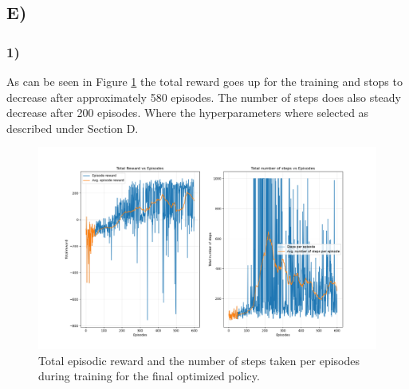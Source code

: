 \documentclass{article}
\begin{document}
\subsection*{E)}
\subsubsection*{1)}
As can be seen in Figure \ref{fig:Policy} the total reward goes up for the training and stops to decrease after approximately 580 episodes. The number of steps does also steady decrease after 200 episodes. Where the hyperparameters where selected as described under Section D.
\begin{figure}[H]
    \centering
    \includegraphics[width=1\textwidth]{Lab_2/problem1/images/main_network.png}
    \caption{\small Total episodic reward and the number of steps taken per episodes during training for the final optimized policy. }
    \label{fig:Policy}
\end{figure}
\end{document}
